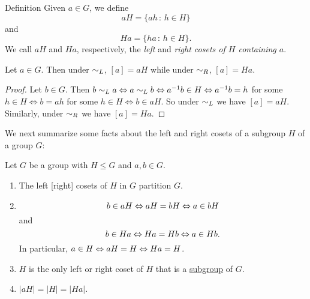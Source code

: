 \begin{df}{Definition} Given $a\in G$, we define $$aH =
\{ah\,:\, h\in H\}$$ and
$$Ha=\{ha\,:\,h\in H\}.$$ We call $aH$ and $Ha$, respectively, the \textit{left } and \textit{right cosets of $H$ containing
$a$}.\end{df}

\begin{thm}\label{[a]} Let $a\in G$.  Then under $\sim_L$, $[a]=aH$ while
under $\sim_R$, $[a]=Ha$.
\end{thm}

\begin{proof} Let $b\in G$.  Then $b\sim_L a \Leftrightarrow a \sim_L b
\Leftrightarrow a^{-1}b\in H \Leftrightarrow a^{-1}b=h$ for some
$h\in H \Leftrightarrow b=ah$ for some $h\in H \Leftrightarrow b\in
aH$. So under $\sim_L$ we have $[a]=aH$.  Similarly, under $\sim_R$ we
have $[a]=Ha$.\end{proof}

 We next summarize some facts about the left and right cosets of
a subgroup $H$ of a group $G$:

\begin{thm}\label{cosetfacts} Let $G$ be a group with $H\leq G$ and $a,b\in G$.
\begin{enumerate}
\item The left [right] cosets of $H$ in $G$ partition $G$.
\item $$b\in aH \Leftrightarrow aH=bH \Leftrightarrow  a\in bH$$ and
    $$b\in Ha \Leftrightarrow  Ha=Hb \Leftrightarrow  a\in
    Hb.$$  In particular, $a\in H \Leftrightarrow aH=H \Leftrightarrow Ha=H$.
\item $H$ is the only left or right coset of $H$ that is a \underline{subgroup}
of $G$.
\item $|aH|=|H|=|Ha|$.
\end{enumerate}\end{thm}

\begin{comment} VERSION WITH K
\begin{thm}\label{cosetfacts} Let $G$ be a group with $H,K\leq G$ and $a,b\in G$.
\begin{enumerate}
\item The left [right] cosets of $H$ in $G$ partition $G$.
\item $$b\in aH \lra aH=bH \lra  a\in bH$$ and
    $$b\in Ha \lra  Ha=Hb \lra  a\in
    Hb.$$  In particular, $a\in H \lra aH=H \lra Ha=H$.
\item $H$ is the only left or right coset of $H$ that is a \underline{subgroup}
of $G$.
\item $|aH|=|H|=|Ha|$.
\item If $K\leq G$ with $K\subseteq H$ then $aK=bK$ implies $aH=bH$.
\end{enumerate}\end{thm}
\end{comment}

